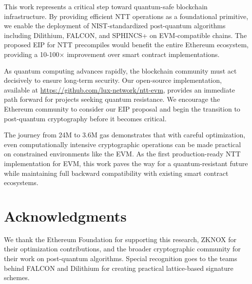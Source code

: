 \documentclass[11pt,a4paper]{article}
\begin{document}
This work represents a critical step toward quantum-safe blockchain infrastructure. By providing efficient NTT operations as a foundational primitive, we enable the deployment of NIST-standardized post-quantum algorithms including Dilithium, FALCON, and SPHINCS+ on EVM-compatible chains. The proposed EIP for NTT precompiles would benefit the entire Ethereum ecosystem, providing a 10-100× improvement over smart contract implementations.

As quantum computing advances rapidly, the blockchain community must act decisively to ensure long-term security. Our open-source implementation, available at \url{https://github.com/lux-network/ntt-evm}, provides an immediate path forward for projects seeking quantum resistance. We encourage the Ethereum community to consider our EIP proposal and begin the transition to post-quantum cryptography before it becomes critical.

The journey from 24M to 3.6M gas demonstrates that with careful optimization, even computationally intensive cryptographic operations can be made practical on constrained environments like the EVM. As the first production-ready NTT implementation for EVM, this work paves the way for a quantum-resistant future while maintaining full backward compatibility with existing smart contract ecosystems.

\section*{Acknowledgments}

We thank the Ethereum Foundation for supporting this research, ZKNOX for their optimization contributions, and the broader cryptographic community for their work on post-quantum algorithms. Special recognition goes to the teams behind FALCON and Dilithium for creating practical lattice-based signature schemes.
\end{document}
